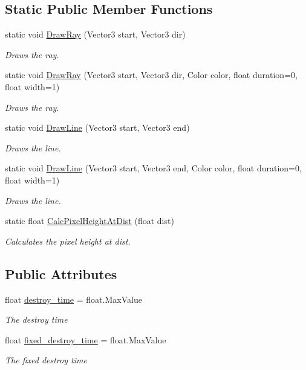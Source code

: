 \subsection*{Static Public Member Functions}
\begin{DoxyCompactItemize}
\item 
static void \hyperlink{class_debug_line_ad5dce7848806f48ae750884ab90b2f94}{Draw\+Ray} (Vector3 start, Vector3 dir)
\begin{DoxyCompactList}\small\item\em Draws the ray. \end{DoxyCompactList}\item 
static void \hyperlink{class_debug_line_a6a60120da5191eb4fdbdedb302cfb9fc}{Draw\+Ray} (Vector3 start, Vector3 dir, Color color, float duration=0, float width=1)
\begin{DoxyCompactList}\small\item\em Draws the ray. \end{DoxyCompactList}\item 
static void \hyperlink{class_debug_line_ae6b924e0cf572d87f77b34b66ff33515}{Draw\+Line} (Vector3 start, Vector3 end)
\begin{DoxyCompactList}\small\item\em Draws the line. \end{DoxyCompactList}\item 
static void \hyperlink{class_debug_line_af9219f4d9be0b63965dcb81d96fa6fad}{Draw\+Line} (Vector3 start, Vector3 end, Color color, float duration=0, float width=1)
\begin{DoxyCompactList}\small\item\em Draws the line. \end{DoxyCompactList}\item 
static float \hyperlink{class_debug_line_a51fdc719debca09b01cbdbd6ee34fb5d}{Calc\+Pixel\+Height\+At\+Dist} (float dist)
\begin{DoxyCompactList}\small\item\em Calculates the pixel height at dist. \end{DoxyCompactList}\end{DoxyCompactItemize}
\subsection*{Public Attributes}
\begin{DoxyCompactItemize}
\item 
float \hyperlink{class_debug_line_a8dd338f42279db7c3021db91b404d7d7}{destroy\+\_\+time} = float.\+Max\+Value
\begin{DoxyCompactList}\small\item\em The destroy time \end{DoxyCompactList}\item 
float \hyperlink{class_debug_line_ad00e7c895184364d924545e9e48780a4}{fixed\+\_\+destroy\+\_\+time} = float.\+Max\+Value
\begin{DoxyCompactList}\small\item\em The fixed destroy time \end{DoxyCompactList}\end{DoxyCompactItemize}


